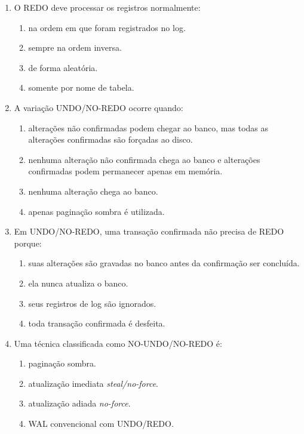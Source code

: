 \documentclass[12pt,a4paper]{article}
\begin{document}
\begin{enumerate}[label=\textbf{Q\arabic*.}]
\item O REDO deve processar os registros normalmente:

\begin{enumerate}[label=\alph*)]
    \item na ordem em que foram registrados no log.
    \item sempre na ordem inversa.
    \item de forma aleatória.
    \item somente por nome de tabela.
\end{enumerate}

\item A variação UNDO/NO-REDO ocorre quando:

\begin{enumerate}[label=\alph*)]
    \item alterações não confirmadas podem chegar ao banco, mas todas as alterações confirmadas são forçadas ao disco.
    \item nenhuma alteração não confirmada chega ao banco e alterações confirmadas podem permanecer apenas em memória.
    \item nenhuma alteração chega ao banco.
    \item apenas paginação sombra é utilizada.
\end{enumerate}

\item Em UNDO/NO-REDO, uma transação confirmada não precisa de REDO porque:

\begin{enumerate}[label=\alph*)]
    \item suas alterações são gravadas no banco antes da confirmação ser concluída.
    \item ela nunca atualiza o banco.
    \item seus registros de log são ignorados.
    \item toda transação confirmada é desfeita.
\end{enumerate}

\item Uma técnica classificada como NO-UNDO/NO-REDO é:

\begin{enumerate}[label=\alph*)]
    \item paginação sombra.
    \item atualização imediata \textit{steal/no-force}.
    \item atualização adiada \textit{no-force}.
    \item WAL convencional com UNDO/REDO.
\end{enumerate}


\end{enumerate}
\end{document}
